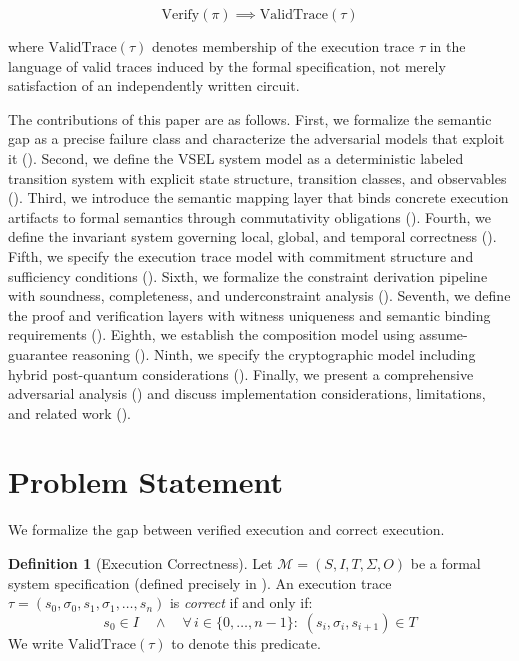 \documentclass[11pt,a4paper]{article}
\theoremstyle{definition}
\newtheorem{definition}{Definition}[section]
\newcommand{\Verify}{\mathrm{Verify}}
\newcommand{\ValidTrace}{\mathrm{ValidTrace}}
\begin{document}
\begin{equation}
\label{eq:central-guarantee}
\Verify(\pi) \implies \ValidTrace(\tau)
\end{equation}

\noindent where $\ValidTrace(\tau)$ denotes membership of the execution trace $\tau$ in the language of valid traces induced by the formal specification, not merely satisfaction of an independently written circuit.

The contributions of this paper are as follows. First, we formalize the semantic gap as a precise failure class and characterize the adversarial models that exploit it (). Second, we define the VSEL system model as a deterministic labeled transition system with explicit state structure, transition classes, and observables (). Third, we introduce the semantic mapping layer that binds concrete execution artifacts to formal semantics through commutativity obligations (). Fourth, we define the invariant system governing local, global, and temporal correctness (). Fifth, we specify the execution trace model with commitment structure and sufficiency conditions (). Sixth, we formalize the constraint derivation pipeline with soundness, completeness, and underconstraint analysis (). Seventh, we define the proof and verification layers with witness uniqueness and semantic binding requirements (). Eighth, we establish the composition model using assume-guarantee reasoning (). Ninth, we specify the cryptographic model including hybrid post-quantum considerations (). Finally, we present a comprehensive adversarial analysis () and discuss implementation considerations, limitations, and related work ().

\section{Problem Statement}
\label{sec:problem}

We formalize the gap between verified execution and correct execution.

\begin{definition}[Execution Correctness]
\label{def:execution-correctness}
Let $\mathcal{M} = (S, I, T, \Sigma, O)$ be a formal system specification (defined precisely in ). An execution trace $\tau = (s_0, \sigma_0, s_1, \sigma_1, \ldots, s_n)$ is \emph{correct} if and only if:
\begin{equation}
s_0 \in I \quad \land \quad \forall\, i \in \{0, \ldots, n{-}1\}:\; (s_i, \sigma_i, s_{i+1}) \in T
\end{equation}
We write $\ValidTrace(\tau)$ to denote this predicate.
\end{definition}
\end{document}
